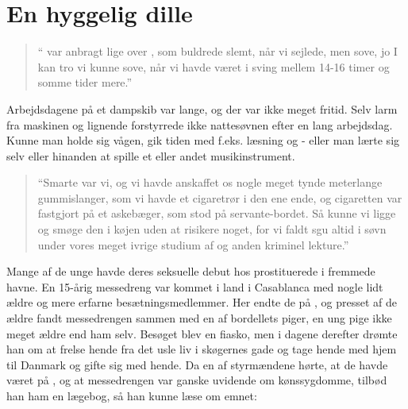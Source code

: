 \chapter{En hyggelig dille}\label{en-hyggelig-dille}

\begin{quote}
    
    `` var anbragt lige over
    , som buldrede slemt, når vi sejlede, men sove,
    jo I kan tro vi kunne sove, når vi havde været i sving mellem 14-16
    timer og somme tider mere.''

\end{quote}

Arbejdsdagene på et dampskib var lange, og der var ikke meget fritid.
Selv larm fra maskinen og lignende forstyrrede ikke nattesøvnen efter en
lang arbejdsdag. Kunne man holde sig vågen, gik tiden med f.eks. læsning
og  - eller man lærte sig selv eller hinanden at spille et
eller andet musikinstrument. 


\begin{quote}
    
    ``Smarte var vi, og vi havde anskaffet os nogle meget tynde
    meterlange gummislanger, som vi havde et cigaretrør i den ene ende,
    og cigaretten var fastgjort på et askebæger, som stod på
    servante-bordet. Så kunne vi ligge og smøge den i køjen uden at
    risikere noget, for vi faldt sgu altid i søvn under vores meget
    ivrige studium af  og
    anden kriminel lekture.'' 

\end{quote}


Mange af de unge havde deres seksuelle debut hos prostituerede i fremmede
havne. En 15-årig messedreng var kommet i land i Casablanca med nogle
lidt ældre og mere erfarne besætningsmedlemmer. Her endte de på
, og presset af de ældre fandt messedrengen sammen
med en af bordellets piger, en ung pige ikke meget ældre end ham selv.
Besøget blev en fiasko, men i dagene derefter drømte han om at frelse
hende fra det usle liv i skøgernes gade og tage hende med hjem til
Danmark og gifte sig med hende.  Da en af styrmændene hørte, at de havde
været på , og at messedrengen var ganske uvidende om
kønssygdomme, tilbød han ham en lægebog, så han kunne læse om emnet: 


